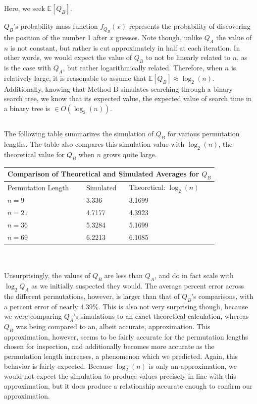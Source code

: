 \documentclass[11pt, oneside]{article}   	%
\begin{document}
\subsection{}
Here, we seek $\mathbb{E}[Q_B]$.

$Q_B$'s probability mass function $f_{Q_B}(x)$ represents the probability of discovering the position of the number 1 after $x$ guesses. Note though, unlike $Q_A$ the value of $n$ is not constant, but rather is cut approximately in half at each iteration. In other words, we would expect the value of $Q_B$ to not be linearly related to $n$, as is the case with $Q_A$, but rather logarithmically related. Therefore, when $n$ is relatively large, it is reasonable to assume that $\mathbb{E}[Q_B]\approx \log_2(n)$. Additionally, knowing that Method B simulates searching through a binary search tree, we know that its expected value, the expected value of search time in a binary tree is $\in O(\log_2(n))$. 
\subsection{}
The following table summarizes the simulation of $Q_B$ for various permutation lengths. The table also compares this simulation value with $\log_2(n)$, the theoretical value for $Q_B$ when $n$ grows quite large.\\

\begin{tabular}{| m{4cm} || m{3.5cm} | m{3.5cm} |}
\hline
\multicolumn{3}{|c|}{Comparison of Theoretical and Simulated Averages for $Q_B$}\\
\hline\hline
Permutation Length & Simulated & Theoretical: $\log_2(n)$\\
\hline
$n=9$ & 3.336 & 3.1699\\
$n=21$ & 4.7177 & 4.3923\\
$n=36$ & 5.3284 & 5.1699\\
$n=69$ & 6.2213 & 6.1085\\
\hline
\end{tabular}\\ \\
Unsurprisingly, the values of $Q_B$ are less than $Q_A$, and do in fact scale with $\log_2{Q_A}$ as we initially suspected they would. The average percent error across the different permutations, however, is larger than that of $Q_B$'s comparisons, with a percent error of nearly $4.39\%$. This is also not very surprising though, because we were comparing $Q_A$'s simulations to an exact theoretical calculation, whereas $Q_B$ was being compared to an, albeit accurate, approximation. This approximation, however, seems to be fairly accurate for the permutation lengths chosen for inspection, and additionally becomes more accurate as the permutation length increases, a phenomenon which we predicted. Again, this behavior is fairly expected. Because $\log_2(n)$ is only an approximation, we would not expect the simulation to produce values precisely in line with this approximation, but it does produce a relationship accurate enough to confirm our approximation.
\end{document}
